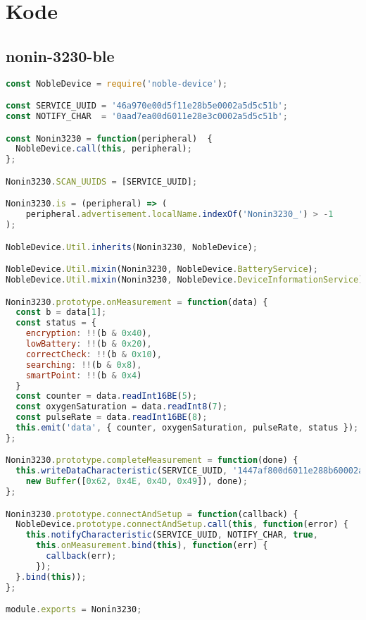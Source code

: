 
\chapter{Kode}

\section{nonin-3230-ble}
\begin{lstlisting}[frame=single, language=JavaScript,
    caption=Nonin 3230 noble-device library, label=lst:nonin-3230-library]
const NobleDevice = require('noble-device');

const SERVICE_UUID = '46a970e00d5f11e28b5e0002a5d5c51b';
const NOTIFY_CHAR  = '0aad7ea00d6011e28e3c0002a5d5c51b';

const Nonin3230 = function(peripheral)  {
  NobleDevice.call(this, peripheral);
};

Nonin3230.SCAN_UUIDS = [SERVICE_UUID];

Nonin3230.is = (peripheral) => (
    peripheral.advertisement.localName.indexOf('Nonin3230_') > -1
);

NobleDevice.Util.inherits(Nonin3230, NobleDevice);

NobleDevice.Util.mixin(Nonin3230, NobleDevice.BatteryService);
NobleDevice.Util.mixin(Nonin3230, NobleDevice.DeviceInformationService);

Nonin3230.prototype.onMeasurement = function(data) {
  const b = data[1];
  const status = {
    encryption: !!(b & 0x40),
    lowBattery: !!(b & 0x20),
    correctCheck: !!(b & 0x10),
    searching: !!(b & 0x8),
    smartPoint: !!(b & 0x4)
  }
  const counter = data.readInt16BE(5);
  const oxygenSaturation = data.readInt8(7);
  const pulseRate = data.readInt16BE(8);
  this.emit('data', { counter, oxygenSaturation, pulseRate, status });
};

Nonin3230.prototype.completeMeasurement = function(done) {
  this.writeDataCharacteristic(SERVICE_UUID, '1447af800d6011e288b60002a5d5c51b',
    new Buffer([0x62, 0x4E, 0x4D, 0x49]), done);
};

Nonin3230.prototype.connectAndSetup = function(callback) {
  NobleDevice.prototype.connectAndSetup.call(this, function(error) {
    this.notifyCharacteristic(SERVICE_UUID, NOTIFY_CHAR, true,
      this.onMeasurement.bind(this), function(err) {
        callback(err);
      });
  }.bind(this));
};

module.exports = Nonin3230;

\end{lstlisting}


